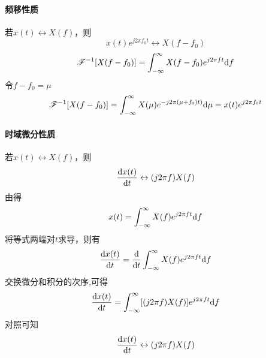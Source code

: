     \paragraph{频移性质}
        若$x(t)\leftrightarrow X(f)$，则
        \begin{equation}
            x(t)e^{j2\pi f_0t}\leftrightarrow X(f-f_0)
        \end{equation}
        \Proof
        \begin{equation*}
            \mathscr{F}^{-1}[X(f-f_0)]=\int_{-\infty}^{\infty}X(f-f_0)e^{j2\pi ft}\text{\upshape d} f    
        \end{equation*}
        令$f-f_0=\mu$
        \begin{equation*}
            \mathscr{F}^{-1}[X(f-f_0)]=\int_{-\infty}^{\infty}X(\mu)e^{-j2\pi (\mu +f_0)t)}\text{\upshape d} \mu = x(t)e^{j2\pi f_0t} 
        \end{equation*}
    \paragraph{时域微分性质}
        若$x(t)\leftrightarrow X(f)$，则
        \begin{equation}
            \frac{\text{\upshape d} x(t)}{\text{\upshape d} t}\leftrightarrow (j2\pi f)X(f)
        \end{equation}
        \Proof 由得
        \begin{equation*}
            x(t) =\int_{-\infty}^{\infty}X(f)e^{j2\pi ft}\text{\upshape d} f
        \end{equation*}
        将等式两端对$t$求导，则有
        \begin{equation*}
            \frac{\text{\upshape d} x(t)}{\text{\upshape d} t} =\frac{\text{\upshape d}}{\text{\upshape d} t}\int_{-\infty}^{\infty}X(f)e^{j2\pi ft}\text{\upshape d} f
        \end{equation*}
        交换微分和积分的次序,可得
        \begin{equation*}
            \frac{\text{\upshape d} x(t)}{\text{\upshape d} t} =\int_{-\infty}^{\infty}[(j2\pi f)X(f)]e^{j2\pi ft}\text{\upshape d} f
        \end{equation*}
        对照可知
        \begin{equation*}
            \frac{\text{\upshape d} x(t)}{\text{\upshape d} t} \leftrightarrow (j2\pi f)X(f)
        \end{equation*}

